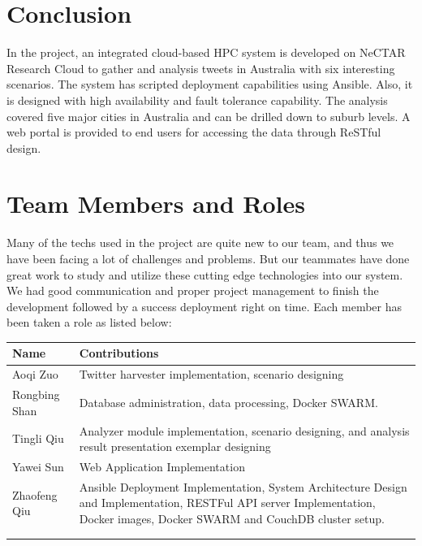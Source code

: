 \documentclass{article}
\begin{document}
\section{Conclusion}
In the project, an integrated cloud-based HPC system is developed on NeCTAR Research Cloud to gather and analysis tweets in Australia with six interesting scenarios. The system has scripted deployment capabilities using Ansible. Also, it is designed with high availability and fault tolerance capability. The analysis covered five major cities in Australia and can be drilled down to suburb levels.  A web portal is provided to end users for accessing the data through ReSTful design.
\section{Team Members and Roles}
Many of the techs used in the project are quite new to our team, and thus we have been facing a lot of challenges and problems. But our teammates have done great work to study and utilize these cutting edge technologies into our system. We had good communication and proper project management to finish the development followed by a success deployment right on time. Each member has been taken a role as listed below:

\begin{tabularx}{0.95\linewidth}{%
	>{\raggedright\arraybackslash}l
	>{\raggedright\arraybackslash}X%
	}
    \toprule
    Name & Contributions\\
    \midrule
    Aoqi Zuo 
    & Twitter harvester implementation, scenario designing
    \\
    \midrule
    Rongbing Shan 
    & Database administration, data processing, Docker SWARM.
    \\
    \midrule
    Tingli Qiu 
    & Analyzer module implementation, scenario designing, and analysis result presentation exemplar designing 
    \\
    \midrule
    Yawei Sun 
    & Web Application Implementation
    \\
    \midrule
    Zhaofeng Qiu 
    & Ansible Deployment Implementation, System Architecture Design and Implementation, RESTFul API server Implementation, Docker images, Docker SWARM and CouchDB cluster setup.
    \\
    \bottomrule
    \\
    \caption{Team Members and Roles}
    \label{tab:my_label}
\end{tabularx}


\end{document}

